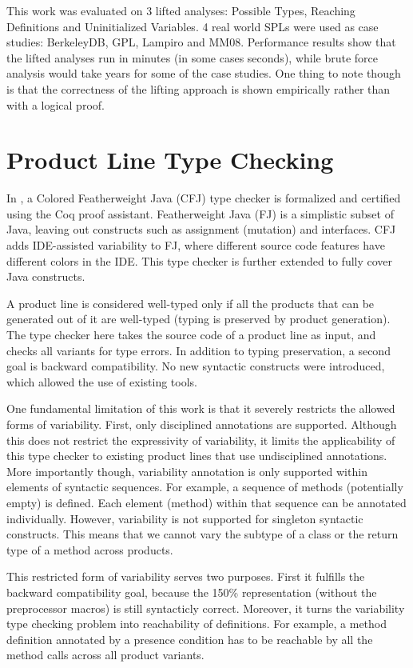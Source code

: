 \documentclass[11pt]{article}
\begin{document}
This work was evaluated on 3 lifted analyses: Possible Types, Reaching Definitions and Uninitialized Variables. 4 real world SPLs were used as case studies: BerkeleyDB, GPL, Lampiro and MM08. Performance results show that the lifted analyses run in minutes (in some cases seconds), while brute force analysis would take years for some of the case studies. One thing to note though is that the correctness of the lifting approach is shown empirically rather than with a logical proof.

\section{Product Line Type Checking}

In \cite{Kastner:2012}, a Colored Featherweight Java (CFJ) type checker is formalized and certified using the Coq\cite{Bertot:2010} proof assistant. Featherweight Java (FJ) is a simplistic subset of Java, leaving out constructs such as assignment (mutation) and interfaces. CFJ adds IDE-assisted variability to FJ, where different source code features have different colors in the IDE. This type checker is further extended to fully cover Java constructs.

A product line is considered well-typed only if all the products that can be generated out of it are well-typed (typing is preserved by product generation). The type checker here takes the source code of a product line as input, and checks all variants for type errors. In addition to typing preservation, a second goal is backward compatibility. No new syntactic constructs were introduced, which allowed the use of existing tools.

One fundamental limitation of this work is that it severely restricts the allowed forms of variability. First, only disciplined annotations are supported. Although this does not restrict the expressivity of variability, it limits the applicability of this type checker to existing product lines that use undisciplined annotations. More importantly though, variability annotation is only supported within elements of syntactic sequences. For example, a sequence of methods (potentially empty) is defined. Each element (method) within that sequence can be annotated individually. However, variability is not supported for singleton syntactic constructs. This means that we cannot vary the subtype of a class or the return type of a method across products.

This restricted form of variability serves two purposes. First it fulfills the backward compatibility goal, because the 150\% representation (without the preprocessor macros) is still syntacticly correct. Moreover, it turns the variability type checking problem into reachability of definitions. For example, a method definition annotated by a presence condition has to be reachable by all the method calls across all product variants. 
 
\end{document}
